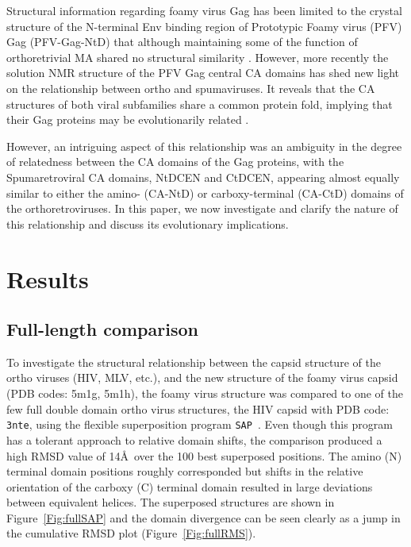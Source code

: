 \documentclass[preprint,12pt]{elsarticle}
\newcommand{\SAP}{{\tt SAP}}
\newcommand{\Fig}[1]{Figure~\ref{Fig:#1}}
\begin{document}
Structural information regarding foamy virus Gag has been limited to the crystal structure of the N-terminal Env binding
region of Prototypic Foamy virus (PFV) Gag (PFV-Gag-NtD) that although maintaining some of the function of orthoretrivial
MA shared no structural similarity \cite{GoldstoneDCet13}. However, more recently the solution NMR structure of the PFV Gag 
central CA domains has shed new light on the relationship between ortho and spumaviruses. It reveals that the CA structures 
of both viral subfamilies share a common protein fold, implying that their Gag proteins may be evolutionarily related 
\cite{BallNJet16}. 

However, an intriguing aspect of this relationship was an ambiguity in the degree of relatedness between the CA domains 
of the Gag proteins, with the Spumaretroviral CA domains, NtDCEN and CtDCEN, appearing almost equally similar to either 
the amino- (CA-NtD) or carboxy-terminal (CA-CtD) domains of the orthoretroviruses. In this paper, we now investigate and 
clarify the nature of this relationship and discuss its evolutionary implications.


\section{Results}

\subsection{Full-length comparison}

To investigate the structural relationship between the capsid structure of the ortho viruses (HIV, MLV, etc.),
and the new structure of the foamy virus capsid \cite{BallNJet16} (PDB codes: 5m1g, 5m1h), the foamy virus structure was
compared to one of the few full double domain ortho virus structures, the HIV capsid with PDB code: {\tt 3nte},
using the flexible superposition program \SAP\ \cite{TaylorWR99a}.   Even though this program has a tolerant approach
to relative domain shifts, the comparison produced a high RMSD value of 14\AA\ over the 100 best superposed
positions.   The amino (N) terminal domain positions roughly corresponded but shifts in the relative
orientation of the carboxy (C) terminal domain resulted in large deviations between equivalent helices.
The superposed structures are shown in \Fig{fullSAP} and the domain divergence can be seen clearly as a
jump in the cumulative RMSD plot (\Fig{fullRMS}).
\end{document}
